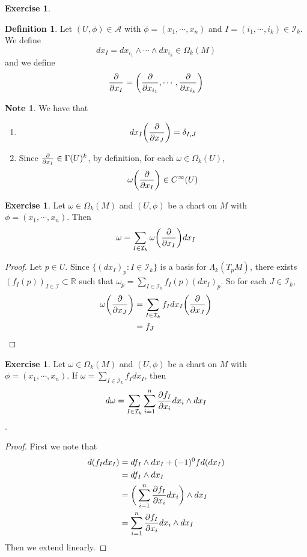 \documentclass[12pt]{amsart}
\theoremstyle{definition}
\newtheorem{defn}[definition]{Definition}
\newtheorem{note}[definition]{Note}
\theoremstyle{definition}
\newtheorem{ex}[definition]{Exercise}
\newcommand{\Gam}{\Gamma}
\newcommand{\del}{\delta}
\newcommand{\Lam}{\Lambda}
\newcommand{\om}{\omega}
\newcommand{\Om}{\Omega}
\newcommand{\R}{\mathbb{R}}
\newcommand{\MA}{\mathcal{A}}
\newcommand{\MI}{\mathcal{I}}
\begin{document}
	\begin{ex}
	
	\end{ex}

	\begin{defn}
		Let $(U, \phi) \in \MA$ with $\phi = (x_1, \cdots, x_n)$ and $I = (i_1, \cdots, i_k) \in \MI_k$. We define $$dx_I = dx_{i_1} \wedge \cdots \wedge dx_{i_k} \in \Om_k(M)$$ 
		and we define $$\pdv{x_I}= \bigg(\pdv{x_{i_1}}, \cdots, \pdv{x_{i_k}} \bigg)$$

	\end{defn}
	
	\begin{note} We have that
	\begin{enumerate}
	\item  $$d x_I \bigg ( \pdv{x_J} \bigg) = \del_{I,J}$$
	\item Since $\pdv{x_I} \in \Gam(U)^k$, by definition, for each $\om \in \Om_k(U)$, $$\om \bigg(\pdv{x_I} \bigg) \in C^{\infty}(U)$$
	\end{enumerate}
	\end{note}

	\begin{ex}
		Let $\om \in \Om_k(M)$ and $(U, \phi)$ be a chart on $M$ with $\phi = (x_1, \cdots, x_n)$. Then $$\om = \sum_{I \in \MI_k}\om \bigg(\pdv{x_I} \bigg) dx_I$$
	\end{ex}

	\begin{proof}
		Let $p \in U$. Since $\{(dx_I)_p: I \in \MI_k\}$ is a basis for $\Lam_k(T_pM)$, there exists $(f_I(p))_{I \in \MI} \subset \R$ such that $\om_p = \sum\limits_{I \in \MI_k} f_I(p) (dx_I)_p$. So for each $J \in \MI_k$, 
		\begin{align*}
			\om\bigg (\pdv{x_J} \bigg ) 
			&= \sum\limits_{I \in \MI_k} f_I dx_I \bigg (\pdv{x_J} \bigg )  \\
			&= f_J
		\end{align*} 
	\end{proof}

	\begin{ex}
		Let $\om \in \Om_k(M)$ and $(U, \phi)$ be a chart on $M$ with $\phi = (x_1, \cdots, x_n)$. If $\om = \sum\limits_{I \in \MI_k}f_I dx_I$, then $$d \om  = \sum_{I \in \MI_k} \sum_{i =1}^n \pdv{f_I}{x_i} dx_i \wedge dx_I$$.
	\end{ex}

	\begin{proof}
		First we note that
		\begin{align*}
			d(f_I dx_I) 
			&= df_I \wedge dx_I + (-1)^0 f d(dx_I) \\
			&= df_I \wedge dx_I \\
			&= \bigg( \sum\limits_{i=1}^n \pdv{f_I}{x_i}dx_i  \bigg) \wedge dx_I \\
			&= \sum\limits_{i=1}^n {\pdv{f_I}{x_i}}dx_i \wedge dx_I \\
		\end{align*}
		Then we extend linearly.
	\end{proof}
	
\end{document}
